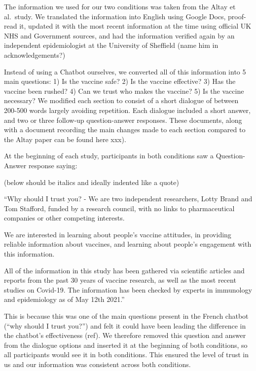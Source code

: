 \documentclass[
  english,
  ,jou,floatsintext]{apa6}
\begin{document}
The information we used for our two conditions was taken from the Altay et al.~study. We translated the information into English using Google Docs, proof-read it, updated it with the most recent information at the time using official UK NHS and Government sources, and had the information verified again by an independent epidemiologist at the University of Sheffield (name him in acknowledgements?)

Instead of using a Chatbot ourselves, we converted all of this information into 5 main questions: 1) Is the vaccine safe? 2) Is the vaccine effective? 3) Has the vaccine been rushed? 4) Can we trust who makes the vaccine? 5) Is the vaccine necessary? We modified each section to consist of a short dialogue of between 200-500 words largely avoiding repetition. Each dialogue included a short answer, and two or three follow-up question-answer responses. These documents, along with a document recording the main changes made to each section compared to the Altay paper can be found here xxx).

At the beginning of each study, participants in both conditions saw a Question-Answer response saying:

(below should be italics and ideally indented like a quote)

``Why should I trust you? - We are two independent researchers, Lotty Brand and Tom Stafford, funded by a research council, with no links to pharmaceutical companies or other competing interests.

We are interested in learning about people's vaccine attitudes, in providing reliable information about vaccines, and learning about people's engagement with this information.

All of the information in this study has been gathered via scientific articles and reports from the past 30 years of vaccine research, as well as the most recent studies on Covid-19. The information has been checked by experts in immunology and epidemiology as of May 12th 2021.''

This is because this was one of the main questions present in the French chatbot (``why should I trust you?'') and felt it could have been leading the difference in the chatbot's effectiveness (ref). We therefore removed this question and answer from the dialogue options and inserted it at the beginning of both conditions, so all participants would see it in both conditions. This ensured the level of trust in us and our information was consistent across both conditions.
\end{document}
